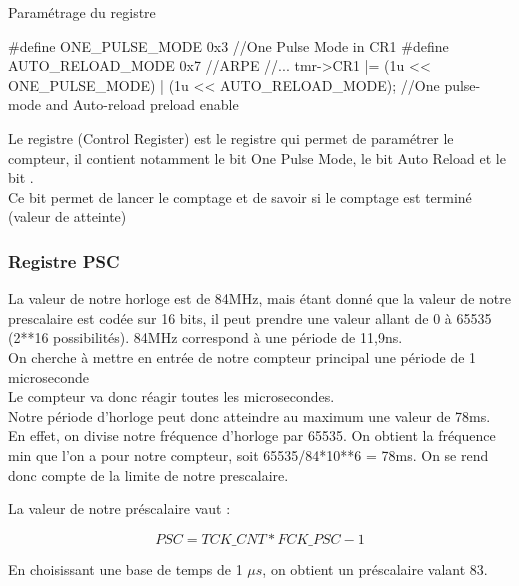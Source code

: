 
\begin{Cpp}{Paramétrage du registre } 

#define ONE_PULSE_MODE 0x3 //One Pulse Mode in CR1
#define AUTO_RELOAD_MODE 0x7 //ARPE
//...
tmr->CR1 |=  (1u << ONE_PULSE_MODE) | (1u << AUTO_RELOAD_MODE);		//One pulse-mode and Auto-reload preload enable
\end{Cpp}

Le registre  (Control Register) est le registre qui permet de paramétrer le compteur, il contient notamment le bit One Pulse Mode, le bit Auto Reload et le bit .\\
Ce bit permet de lancer le comptage et de savoir si le comptage est terminé (valeur de  atteinte)







\newpage
\subsubsection{Registre PSC}


La valeur de notre horloge est de 84MHz, mais étant donné que la valeur de notre prescalaire est codée sur 16 bits, il peut prendre une valeur allant de 0 à 65535 (2**16 possibilités). 
84MHz correspond à une période de 11,9ns. \\On cherche à mettre en entrée de notre compteur principal une période de 1 microseconde\\
Le compteur va donc réagir toutes les microsecondes.\\

Notre période d'horloge peut donc atteindre au maximum une valeur de 78ms. En effet, on divise notre fréquence d'horloge par 65535. 
On obtient la fréquence min que l'on a pour notre compteur, soit 65535/84*10**6 = 78ms.
On se rend donc compte de la limite de notre prescalaire.

La valeur de notre préscalaire vaut : 

\begin{equation}
PSC = TCK\_CNT*FCK\_PSC-1
\end{equation}

En choisissant une base de temps de 1 $\mu s$, on obtient un préscalaire valant 83.


